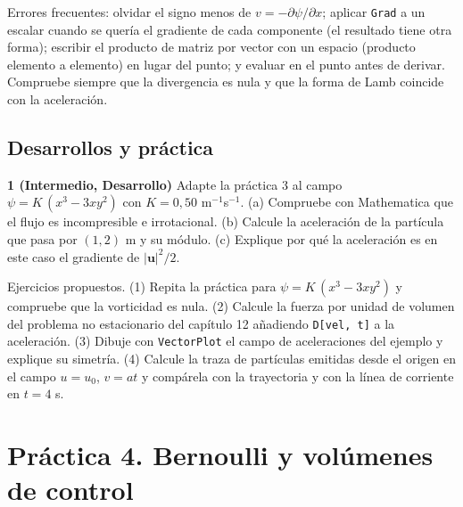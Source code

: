 \documentclass[10pt,openany]{book}
\begin{document}
\begin{tcolorbox}[title={Consejo}, studiumtip, breakable]

Errores frecuentes: olvidar el signo menos de \(v = -\partial\psi/\partial x\); aplicar \texttt{Grad} a un escalar cuando se quería el gradiente de cada componente (el resultado tiene otra forma); escribir el producto de matriz por vector con un espacio (producto elemento a elemento) en lugar del punto; y evaluar en el punto antes de derivar. Compruebe siempre que la divergencia es nula y que la forma de Lamb coincide con la aceleración.
\end{tcolorbox}



\section{Desarrollos y práctica}

\begin{tcolorbox}[title={Ejercicios propuestos}, studiumworked, breakable]

\noindent\textbf{1 (Intermedio, Desarrollo)}
Adapte la práctica 3 al campo \(\psi = K\,(x^{3} - 3xy^{2})\) con \(K = 0{,}50\) m\(^{-1}\)s\(^{-1}\). (a) Compruebe con Mathematica que el flujo es incompresible e irrotacional. (b) Calcule la aceleración de la partícula que pasa por \((1, 2)\) m y su módulo. (c) Explique por qué la aceleración es en este caso el gradiente de \(|\mathbf{u}|^{2}/2\).
\end{tcolorbox}

\begin{tcolorbox}[title={Autoevaluación}, studiumcheck, breakable]

Ejercicios propuestos. (1) Repita la práctica para \(\psi = K\,(x^{3} - 3xy^{2})\) y compruebe que la vorticidad es nula. (2) Calcule la fuerza por unidad de volumen del problema no estacionario del capítulo 12 añadiendo \texttt{D[vel, t]} a la aceleración. (3) Dibuje con \texttt{VectorPlot} el campo de aceleraciones del ejemplo y explique su simetría. (4) Calcule la traza de partículas emitidas desde el origen en el campo \(u = u_0\), \(v = a t\) y compárela con la trayectoria y con la línea de corriente en \(t = 4\) s.
\end{tcolorbox}
\studiumchaptercheck

\chapter{Práctica 4. Bernoulli y volúmenes de control}
\label{chap:m04}
\end{document}

